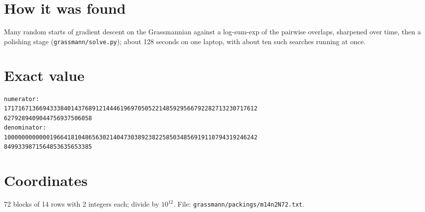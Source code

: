 \documentclass[11pt,a4paper]{article}
\begin{document}
\section{How it was found}
Many random starts of gradient descent on the Grassmannian against a log-sum-exp of the pairwise overlaps, sharpened over time, then a polishing stage (\texttt{grassmann/solve.py}); about 128 seconds on one laptop, with about ten such searches running at once.


\appendix
\section{Exact value}
{\small
\begin{verbatim}
numerator:
171716713669433384014376891214446196970505221485929566792282713230717612
6279289409044756937506058
denominator:
100000000000019664181048656302140473038923822585034856919110794319246242
8499339871564853635653385
\end{verbatim}}

\section{Coordinates}
72 blocks of 14 rows with 2 integers each; divide by $10^{12}$. File: \texttt{grassmann/packings/m14n2N72.txt}.
{\tiny
\begin{multicols}{4}
\end{multicols}}
\end{document}
